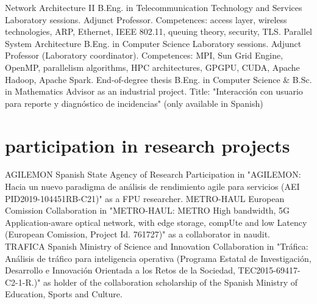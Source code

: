 \documentclass[]{friggeri-cv}
\begin{document}
\begin{entrylist}
{}
{Network Architecture II}
{B.Eng. in Telecommunication Technology and Services}
{Laboratory sessions. Adjunct Professor. Competences: access layer, wireless technologies, ARP, Ethernet, IEEE 802.11, queuing theory, security, TLS. %
}
{Parallel System Architecture}
{B.Eng. in Computer Science}
{Laboratory sessions. Adjunct Professor (Laboratory coordinator). Competences: MPI, Sun Grid Engine, OpenMP, parallelism algorithms, HPC architectures, GPGPU, CUDA, Apache Hadoop, Apache Spark. %
}
{End-of-degree thesis}
{B.Eng. in Computer Science \& B.Sc. in Mathematics}
{Advisor as an industrial project. Title: "Interacción con usuario para reporte y diagnóstico de incidencias" (only available in Spanish)
}
\end{entrylist}

\section{participation in research projects}
\vspace{-1em}
\begin{entrylist}
{AGILEMON}
{Spanish State Agency of Research}
{Participation in "AGILEMON: Hacia un nuevo paradigma de análisis de rendimiento agile para servicios (AEI PID2019-104451RB-C21)" as a FPU researcher.
}
{METRO-HAUL}
{European Comission}
{Collaboration in "METRO-HAUL: METRO High bandwidth, 5G Application-aware optical network, with edge storage, compUte and low Latency (European Comission, Project Id. 761727)" as a collaborator in naudit.
}
{TRAFICA}
{Spanish Ministry of Science and Innovation}
{Collaboration in  "Tráfica: Análisis de tráfico para inteligencia operativa (Programa Estatal de Investigación, Desarrollo e Innovación Orientada a los Retos de la Sociedad, TEC2015-69417-C2-1-R.)" as holder of the collaboration scholarship of the Spanish Ministry of Education, Sports and Culture.
}
\end{entrylist}
\vspace{-2em}
\end{document}
